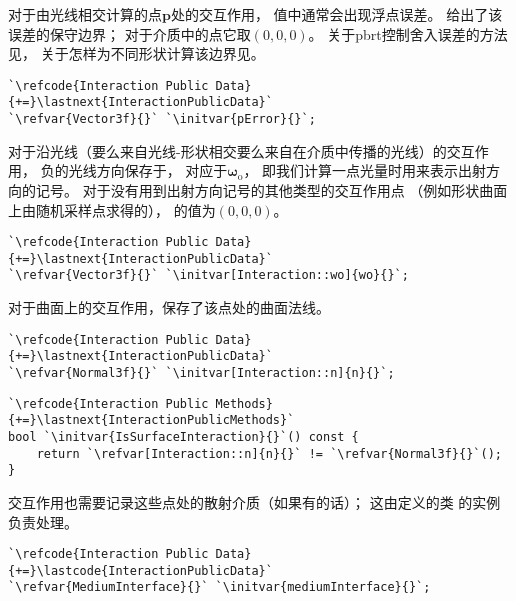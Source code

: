 对于由光线相交计算的点$\bm p$处的交互作用，
值中通常会出现浮点误差。
给出了该误差的保守边界；
对于介质中的点它取$(0,0,0)$。
关于pbrt控制舍入误差的方法见，
关于怎样为不同形状计算该边界见。
\begin{lstlisting}
`\refcode{Interaction Public Data}{+=}\lastnext{InteractionPublicData}`
`\refvar{Vector3f}{}` `\initvar{pError}{}`;
\end{lstlisting}

对于沿光线（要么来自光线-形状相交要么来自在介质中传播的光线）的交互作用，
负的光线方向保存于，
对应于$\bm \omega_{\mathrm{o}}$，
即我们计算一点光量时用来表示出射方向的记号。
对于没有用到出射方向记号的其他类型的交互作用点
（例如形状曲面上由随机采样点求得的），
的值为$(0,0,0)$。
\begin{lstlisting}
`\refcode{Interaction Public Data}{+=}\lastnext{InteractionPublicData}`
`\refvar{Vector3f}{}` `\initvar[Interaction::wo]{wo}{}`;
\end{lstlisting}

对于曲面上的交互作用，保存了该点处的曲面法线。
\begin{lstlisting}
`\refcode{Interaction Public Data}{+=}\lastnext{InteractionPublicData}`
`\refvar{Normal3f}{}` `\initvar[Interaction::n]{n}{}`;
\end{lstlisting}
\begin{lstlisting}
`\refcode{Interaction Public Methods}{+=}\lastnext{InteractionPublicMethods}`
bool `\initvar{IsSurfaceInteraction}{}`() const {
    return `\refvar[Interaction::n]{n}{}` != `\refvar{Normal3f}{}`();
}
\end{lstlisting}

交互作用也需要记录这些点处的散射介质（如果有的话）；
这由定义的类
的实例负责处理。
\begin{lstlisting}
`\refcode{Interaction Public Data}{+=}\lastcode{InteractionPublicData}`
`\refvar{MediumInterface}{}` `\initvar{mediumInterface}{}`;
\end{lstlisting}

